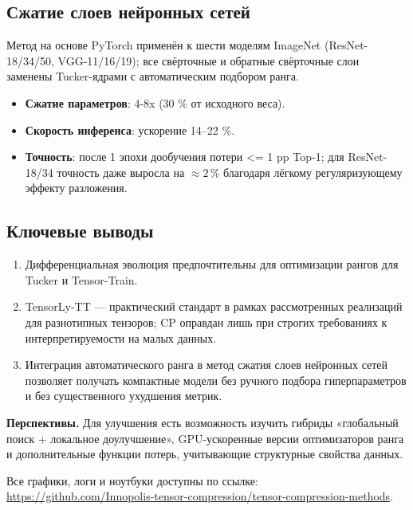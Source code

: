 \subsection*{Сжатие слоев нейронных сетей}
Метод на основе PyTorch применён к шести моделям ImageNet (ResNet-18/34/50, VGG-11/16/19); все свёрточные и обратные свёрточные слои заменены Tucker-ядрами с автоматическим подбором ранга.
\begin{itemize}\setlength\itemsep{0.2em}
    \item \textbf{Сжатие параметров}: 4-8x (30 \% от исходного веса).
    \item \textbf{Скорость инференса}: ускорение 14–22 \%.  
    \item \textbf{Точность}: после 1 эпохи дообучения потери <= 1 pp Top-1; для ResNet-18/34 точность даже выросла на ${\approx} 2\,\%$ благодаря лёгкому регуляризующему эффекту разложения.
\end{itemize}

\subsection*{Ключевые выводы}
\begin{enumerate}\setlength\itemsep{0.2em}
    \item Дифференциальная эволюция предпочтительны для оптимизации рангов для Tucker и Tensor-Train.  
    \item TensorLy-TT — практический стандарт в рамках рассмотренных реализаций для разнотипных тензоров; CP оправдан лишь при строгих требованиях к интерпретируемости на малых данных.  
    \item Интеграция автоматического ранга в метод сжатия слоев нейронных сетей позволяет получать компактные модели без ручного подбора гиперпараметров и без существенного ухудшения метрик.
\end{enumerate}

\textbf{Перспективы.} Для улучшения есть возможность изучить гибриды «глобальный поиск + локальное доулучшение», GPU-ускоренные версии оптимизаторов ранга и дополнительные функции потерь, учитывающие структурные свойства данных.  

Все графики, логи и ноутбуки доступны по ссылке:  
\url{https://github.com/Innopolis-tensor-compression/tensor-compression-methods}.